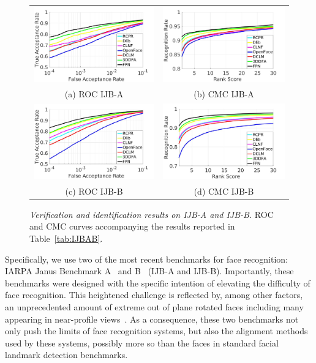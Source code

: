 \documentclass[10pt,twocolumn,letterpaper]{article}
\begin{document}
\begin{figure}[t]
\centering
\begin{tabular}{cc}
\includegraphics[width=.42\linewidth]{figures/ROC_IJBA_oriExpandBbox.jpg}&
\includegraphics[width=.42\linewidth]{figures/CMC_IJBA_oriExpandBbox.jpg}\\
(a) ROC IJB-A & (b) CMC IJB-A\\
\includegraphics[width=.42\linewidth]{figures/ROC_IJBB_oriExpandBbox.jpg}&
\includegraphics[width=.42\linewidth]{figures/CMC_IJBB_oriExpandBbox.jpg}\\
 (c) ROC IJB-B & (d) CMC IJB-B\\
\end{tabular}
\caption{{\em Verification and identification results on IJB-A and IJB-B.}
ROC and CMC curves accompanying the results reported in Table~\ref{tab:IJBAB}. }\label{fig:ROC_CMC}
\vspace{-3mm}
\end{figure}

Specifically, we use two of the most recent benchmarks for face recognition: IARPA Janus Benchmark A~\cite{Klare_2015_CVPR} and B~\cite{whitelam2017iarpa} (IJB-A and IJB-B). Importantly, these benchmarks were designed with the specific intention of elevating the difficulty of face recognition. This heightened challenge is reflected by, among other factors, an unprecedented amount of extreme out of plane rotated faces including many appearing in near-profile views~\cite{masi16dowe}. As a consequence, these two benchmarks not only push the limits of face recognition systems, but also the alignment methods used by these systems, possibly more so than the faces in standard facial landmark detection benchmarks.
\end{document}
